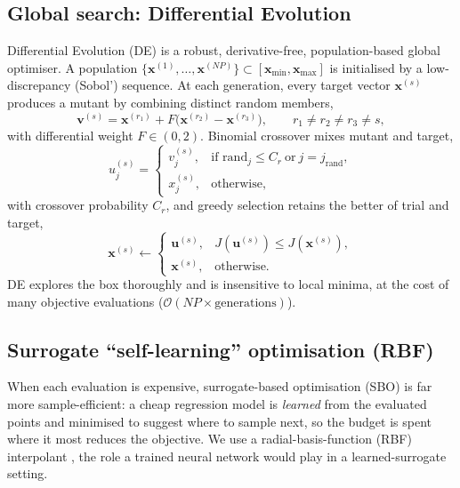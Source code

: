 \documentclass[11pt]{article}
\newcommand{\xv}{\bm{x}}
\begin{document}
\subsection{Global search: Differential Evolution}
Differential Evolution (DE) \citep{Storn1997} is a robust, derivative-free,
population-based global optimiser. A population
$\{\xv^{(1)},\dots,\xv^{(NP)}\}\subset[\xv_{\min},\xv_{\max}]$ is initialised by a
low-discrepancy (Sobol') sequence. At each generation, every target vector
$\xv^{(s)}$ produces a mutant by combining distinct random members,
\begin{equation}
  \bm{v}^{(s)}=\xv^{(r_1)}+F\big(\xv^{(r_2)}-\xv^{(r_3)}\big),
  \qquad r_1\ne r_2\ne r_3\ne s,
  \label{eq:de-mut}
\end{equation}
with differential weight $F\in(0,2)$. Binomial crossover mixes mutant and target,
\begin{equation}
  u^{(s)}_j=
  \begin{cases}
    v^{(s)}_j, & \text{if } \mathrm{rand}_j\le C_r \ \text{or}\ j=j_{\mathrm{rand}},\\
    x^{(s)}_j, & \text{otherwise,}
  \end{cases}
  \label{eq:de-cross}
\end{equation}
with crossover probability $C_r$, and greedy selection retains the better of trial
and target,
\begin{equation}
  \xv^{(s)}\leftarrow
  \begin{cases}
    \bm{u}^{(s)}, & J(\bm{u}^{(s)})\le J(\xv^{(s)}),\\
    \xv^{(s)},    & \text{otherwise.}
  \end{cases}
  \label{eq:de-sel}
\end{equation}
DE explores the box thoroughly and is insensitive to local minima, at the cost of
many objective evaluations ($\mathcal{O}(NP\times\text{generations})$).

\subsection{Surrogate ``self-learning'' optimisation (RBF)}
When each evaluation is expensive, surrogate-based optimisation (SBO)
\citep{Jones1998,Forrester2009} is far more sample-efficient: a cheap regression
model is \emph{learned} from the evaluated points and minimised to suggest where
to sample next, so the budget is spent where it most reduces the objective. We use
a radial-basis-function (RBF) interpolant \citep{Hardy1971,Wendland2004,Gutmann2001},
the role a trained neural network would play in a learned-surrogate setting.
\end{document}
